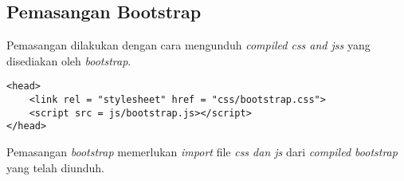 \begin{table}[H]
	\centering
	\caption{\textit{Browser Desktop} yang mendukung \textit{bootstrap}}
\label{tab:bootstrap desktop supported}
\end{table}






\subsection{Pemasangan Bootstrap}
Pemasangan dilakukan dengan cara mengunduh \textit{compiled css and jss} yang disediakan oleh \textit{bootstrap}.

\begin{lstlisting}
<head>
	<link rel = "stylesheet" href = "css/bootstrap.css">
	<script src = js/bootstrap.js></script>
</head>
\end{lstlisting}

Pemasangan \textit{bootstrap} memerlukan \textit{import} file \textit{css dan js} dari \textit{compiled bootstrap} yang telah diunduh.





 
